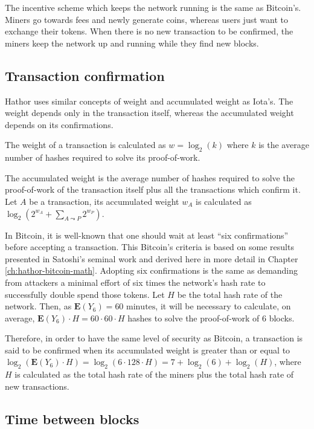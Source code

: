 The incentive scheme which keeps the network running is the same as Bitcoin's. Miners go towards fees and newly generate coins, whereas users just want to exchange their tokens. When there is no new transaction to be confirmed, the miners keep the network up and running while they find new blocks.


\subsection{Transaction confirmation}

Hathor uses similar concepts of weight and accumulated weight as Iota's. The weight depends only in the transaction itself, whereas the accumulated weight depends on its confirmations.

The weight of a transaction is calculated as $w = \log_2(k)$ where $k$ is the average number of hashes required to solve its proof-of-work.

The accumulated weight is the average number of hashes required to solve the proof-of-work of the transaction itself plus all the transactions which confirm it. Let $A$ be a transaction, its accumulated weight $w_A$ is calculated as $\log_2(2^{w_A} + \sum_{A \leadsto P} 2^{w_P})$.

In Bitcoin, it is well-known that one should wait at least ``six confirmations'' before accepting a transaction. This Bitcoin's criteria is based on some results presented in Satoshi's seminal work \citep{nakamoto2008bitcoin} and derived here in more detail in Chapter \ref{ch:hathor-bitcoin-math}. Adopting six confirmations is the same as demanding from attackers a minimal effort of six times the network's hash rate to successfully double spend those tokens. Let $H$ be the total hash rate of the network. Then, as $\mathbf{E}(Y_6) = 60 \text{ minutes}$, it will be necessary to calculate, on average, $\mathbf{E}(Y_6) \cdot H = 60 \cdot 60 \cdot H$ hashes to solve the proof-of-work of 6 blocks.

Therefore, in order to have the same level of security as Bitcoin, a transaction is said to be confirmed when its accumulated weight is greater than or equal to $\log_2(\mathbf{E}(Y_6) \cdot H) = \log_2(6 \cdot 128 \cdot H) = 7 + \log_2(6) + \log_2(H)$, where $H$ is calculated as the total hash rate of the miners plus the total hash rate of new transactions.


\subsection{Time between blocks}

